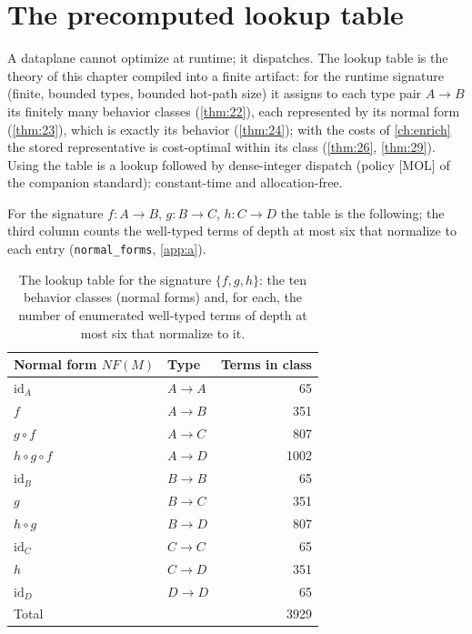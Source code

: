 \section{The precomputed lookup table}\label{sec:free-table}

A dataplane cannot optimize at runtime; it dispatches. The lookup table is the
theory of this chapter compiled into a finite artifact: for the runtime
signature (finite, bounded types, bounded hot-path size) it assigns to each
type pair $A \to B$ its finitely many behavior classes (\autoref{thm:22}), each
represented by its normal form (\autoref{thm:23}), which is exactly its behavior (\autoref{thm:24});
with the costs of \autoref{ch:enrich} the stored representative is
cost-optimal within its class (\autoref{thm:26}, \autoref{thm:29}). Using the table is a lookup
followed by dense-integer dispatch (policy [MOL] of the companion standard):
constant-time and allocation-free.

For the signature $f \colon A \to B$, $g \colon B \to C$, $h \colon C \to D$
the table is the following; the third column counts the well-typed terms of
depth at most six that normalize to each entry (\texttt{normal\_forms},
\autoref{app:a}).

\begin{table}[htbp]
\centering
\begin{tabular}{@{}llr@{}}
\toprule
\textbf{Normal form $\mathit{NF} (M)$} & \textbf{Type} & \textbf{Terms in class} \\
\midrule
$\mathrm{id}_A$         & $A \to A$ & 65   \\
$f$                     & $A \to B$ & 351  \\
$g \circ f$             & $A \to C$ & 807  \\
$h \circ g \circ f$     & $A \to D$ & 1002 \\
$\mathrm{id}_B$         & $B \to B$ & 65   \\
$g$                     & $B \to C$ & 351  \\
$h \circ g$             & $B \to D$ & 807  \\
$\mathrm{id}_C$         & $C \to C$ & 65   \\
$h$                     & $C \to D$ & 351  \\
$\mathrm{id}_D$         & $D \to D$ & 65   \\
\midrule
Total                   &           & 3929 \\
\bottomrule
\end{tabular}
\caption{The lookup table for the signature $\{f, g, h\}$: the ten behavior
classes (normal forms) and, for each, the number of enumerated well-typed
terms of depth at most six that normalize to it.}
\label{tab:lookup}
\end{table}

